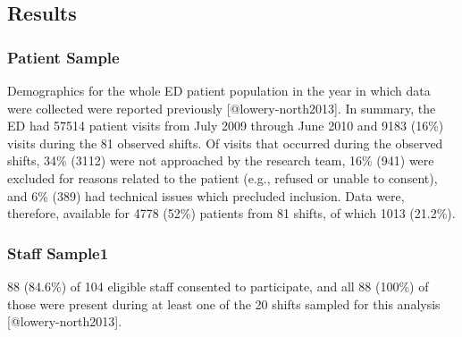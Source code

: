 \documentclass[
]{article}
\begin{document}
\hypertarget{results}{%
\subsection{Results}\label{results}}

\hypertarget{patient-sample}{%
\subsubsection{Patient Sample}\label{patient-sample}}

Demographics for the whole ED patient population in the year in which
data were collected were reported previously {[}@lowery-north2013{]}. In
summary, the ED had 57514 patient visits from July 2009 through June
2010 and 9183 (16\%) visits during the 81 observed shifts. Of visits
that occurred during the observed shifts, 34\% (3112) were not
approached by the research team, 16\% (941) were excluded for reasons
related to the patient (e.g., refused or unable to consent), and 6\%
(389) had technical issues which precluded inclusion. Data were,
therefore, available for 4778 (52\%) patients from 81 shifts, of which
1013 (21.2\%).

\hypertarget{staff-sample1}{%
\subsubsection{Staff Sample1}\label{staff-sample1}}

88 (84.6\%) of 104 eligible staff consented to participate, and all 88
(100\%) of those were present during at least one of the 20 shifts
sampled for this analysis {[}@lowery-north2013{]}.
\end{document}
